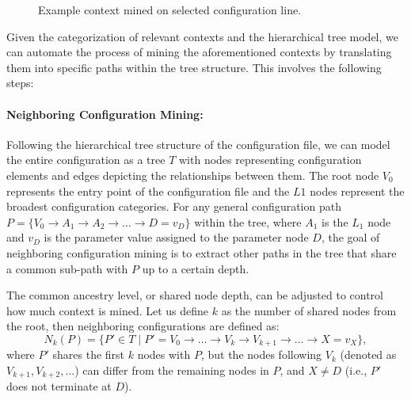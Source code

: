 \begin{figure}[t]
    \centering
    \caption{Example context mined on selected configuration line.}
    \label{fig:context_mine}
\end{figure}

Given the categorization of relevant contexts and the hierarchical tree model, we can automate the process of mining the aforementioned contexts by translating them into specific paths within the tree structure. This involves the following steps:
\paragraph{Neighboring Configuration Mining:}
    Following the hierarchical tree structure of the configuration file, we can model the entire configuration as a tree \( T \) with nodes representing configuration elements and edges depicting the relationships between them. The root node \(V_0\) represents the entry point of the configuration file and the \(L1\) nodes represent the broadest configuration categories.
    For any general configuration path \( P = \{ V_0 \rightarrow A_1 \rightarrow A_2 \rightarrow \dots \rightarrow D = v_D \} \) within the tree, where \(A_1\) is the \(L_1\) node and \( v_D \) is the parameter value assigned to the parameter node \( D \), the goal of neighboring configuration mining is to extract other paths in the tree that share a common sub-path with \( P \) up to a certain depth. 
    
    The common ancestry level, or shared node depth, can be adjusted to control how much context is mined. Let us define \( k \) as the number of shared nodes from the root, then neighboring configurations are defined as:
\[
N_k(P) = \{ P' \in T \mid P' = V_0 \rightarrow \dots \rightarrow V_k \rightarrow V_{k+1} \rightarrow \dots \rightarrow X = v_X \},
\]
where \( P' \) shares the first \( k \) nodes with \( P \), but the nodes following \( V_k \) (denoted as \( V_{k+1}, V_{k+2}, \dots \)) can differ from the remaining nodes in \( P \), and \( X \neq D \) (i.e., \( P' \) does not terminate at \( D \)).

